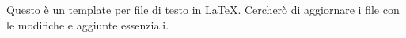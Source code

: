 Questo è un template per file di testo in LaTeX. Cercherò di aggiornare i file con le modifiche e aggiunte essenziali.
